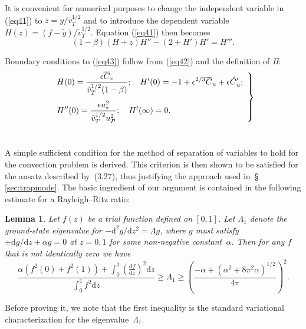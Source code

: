 \documentclass{jfm}
\providecommand\upi{\pi}%
\providecommand\upi{\pi}%
\let\ge=\geqslant  \let\geq=\geqslant
\newtheorem{lemma}{Lemma}
\begin{document}
It is convenient for numerical purposes to change the independent variable in
(\ref{eq41}) to $z=y/ \tilde{v}^{{1}/{2}}_T$ and to introduce the
dependent variable $H(z) = (f- \tilde{y})/ \tilde{v}^{{1}/{2}}_T$.
Equation (\ref{eq41}) then becomes
\begin{equation}
  (1 - \beta)(H+z)H'' - (2+ H') H' = H'''.
\end{equation}

Boundary conditions to (\ref{eq43}) follow from (\ref{eq42}) and the
definition of \textit{H}:
\begin{equation}
\left. \begin{array}{l}
\displaystyle
H(0) = \frac{\epsilon \overline{C}_v}{\tilde{v}^{{1}/{2}}_T
(1- \beta)};\quad H'(0) = -1+\epsilon^{{2}/{3}} \overline{C}_u
+ \epsilon \skew5\hat{C}_u'; \\[16pt]
\displaystyle
H''(0) = \frac{\epsilon u^2_{\ast}}{\tilde{v}^{{1}/{2}}
_T u^2_P};\quad H' (\infty) = 0.
\end{array} \right\}
\end{equation}

\section{}

A simple sufficient condition for the method of separation of variables to hold
for the convection problem is derived.  This criterion is then shown to be
satisfied for the ansatz described by~(3.27), thus justifying the approach used
in~\S\,\ref{sec:trapmode}.  The basic ingredient of our argument is contained
in the following estimate for a Rayleigh--Ritz ratio:
\begin{lemma}
Let $f(z)$ be a trial function defined on $[0,1]$.  Let $\varLambda_1$ denote
the ground-state eigenvalue for $-\mathrm{d}^2g/\mathrm{d} z^2=\varLambda g$,
where $g$ must satisfy $\pm\mathrm{d} g/\mathrm{d} z+\alpha g=0$ at $z=0,1$
for some non-negative constant~$\alpha$.  Then for any $f$ that is not
identically zero we have
\begin{equation}
\frac{\displaystyle
  \alpha(f^2(0)+f^2(1)) + \int_0^1 \left(
  \frac{\mathrm{d} f}{\mathrm{d} z} \right)^2 \mathrm{d} z}%
  {\displaystyle \int_0^1 f^2\mathrm{d} z}
\ge \varLambda_1 \ge
\left( \frac{-\alpha+(\alpha^2+8\upi^2\alpha)^{1/2}}{4\upi} \right)^2.
\end{equation}
\end{lemma}

Before proving it, we note that the first inequality is the standard
variational characterization for the eigenvalue~$\varLambda_1$.
\end{document}
